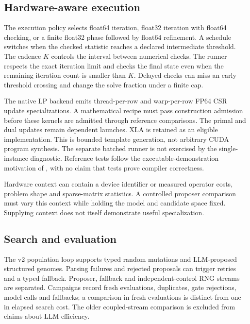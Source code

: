 \subsection{Hardware-aware execution}
\label{sec:hardware}

The execution policy selects float64 iteration, float32 iteration with float64
checking, or a finite float32 phase followed by float64 refinement. A schedule
switches when the checked statistic reaches a declared intermediate threshold.
The cadence $K$ controls the interval between numerical checks. The runner
respects the exact iteration limit and checks the final state even when the
remaining iteration count is smaller than $K$. Delayed checks can miss an early
threshold crossing and change the solve fraction under a finite cap.

The native LP backend emits thread-per-row and warp-per-row FP64 CSR update
specializations. A mathematical recipe must pass construction admission before
these kernels are admitted through reference comparisons. The primal and dual
updates remain dependent launches. XLA is retained as an eligible implementation.
This is bounded template generation, not arbitrary CUDA program synthesis.
The separate batched runner is not exercised by the single-instance diagnostic.
Reference tests follow the executable-demonstration motivation of
\citet{Hawkeye2026}, with no claim that tests prove compiler correctness.

Hardware context can contain a device identifier or measured operator costs,
problem shape and sparse-matrix statistics. A controlled proposer comparison
must vary this context while holding the model and candidate space fixed.
Supplying context does not itself demonstrate useful specialization.

\subsection{Search and evaluation}
\label{sec:loop}

The v2 population loop supports typed random mutations and LLM-proposed
structured genomes. Parsing failures and rejected proposals can trigger retries
and a typed fallback. Proposer, fallback and independent-control RNG streams
are separated. Campaigns record fresh evaluations, duplicates, gate rejections,
model calls and fallbacks; a comparison in fresh evaluations is distinct from
one in elapsed search cost. The older coupled-stream comparison is excluded
from claims about LLM efficiency.

